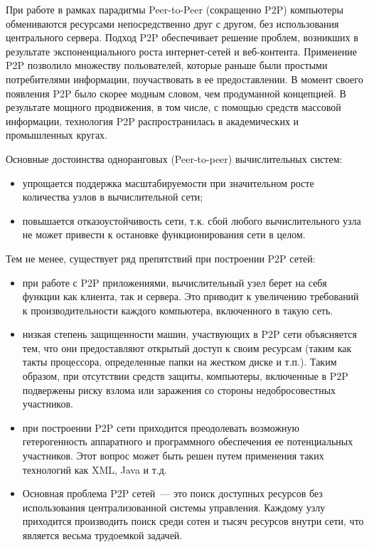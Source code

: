 При работе в рамках парадигмы Peer-to-Peer (сокращенно P2P) компьютеры обмениваются ресурсами непосредственно друг с другом, без использования центрального сервера. Подход P2P обеспечивает решение проблем, возникших в результате экспоненциального роста интернет-сетей и веб-контента. Применение P2P позволило множеству польователей, которые раньше были простыми потребителями информации, поучаствовать в ее предоставлении. В момент своего появления P2P было скорее модным словом, чем продуманной концепцией. В результате мощного продвижения, в том числе, с помощью средств массовой информации, технология P2P распространилась в академических и промышленных кругах.

Основные достоинства одноранговых (Peer-to-peer) вычислительных систем:
\begin{itemize}
\item упрощается поддержка масштабируемости при значительном росте количества узлов в вычислительной сети; 
\item повышается отказоустойчивость сети, т.к. сбой любого вычислительного узла не может привести к остановке функционирования сети в целом.
\end{itemize}

Тем не менее, существует ряд препятствий при построении P2P сетей:
\begin{itemize}
\item при работе с P2P приложениями, вычислительный узел берет на себя функции как клиента, так и сервера. Это приводит к увеличению требований к производительности каждого компьютера, включенного в такую сеть.
\item низкая степень защищенности машин, участвующих в P2P сети объясняется тем, что они предоставляют открытый доступ к своим ресурсам (таким как такты процессора, определенные папки на жестком диске и т.п.). Таким образом, при отсутствии средств защиты, компьютеры, включенные в P2P подвержены риску взлома или заражения со стороны недобросовестных участников. 
\item при построении P2P сети приходится преодолевать возможную гетерогенность аппаратного и программного обеспечения ее потенциальных участников. Этот вопрос может быть решен путем применения таких технологий как XML, Java и т.д.
\item Основная проблема P2P сетей~--- это поиск доступных ресурсов без использования централизованной системы управления. Каждому узлу приходится производить поиск среди сотен и тысяч ресурсов внутри сети, что является весьма трудоемкой задачей.
\end{itemize}

